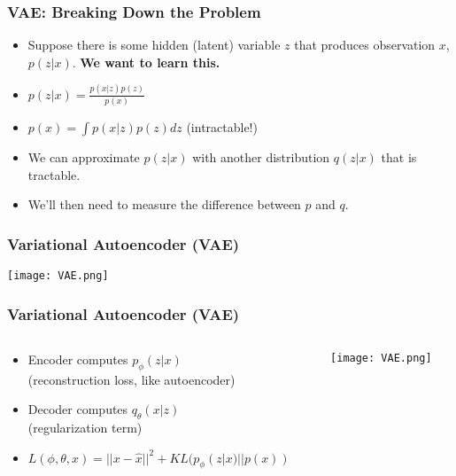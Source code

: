 \begin{frame}
    \frametitle{VAE: Breaking Down the Problem}
    \begin{itemize}
        \item<1-> Suppose there is some hidden (latent) variable $z$ that produces
            observation $x$, $p(z|x)$. \textbf{We want to learn this.}
        \item<2-> $p(z|x) = \frac{p(x|z)p(z)}{p(x)}$
        \item<3-> $p(x) = \int p(x|z)p(z)dz$ (intractable!)
        \item<4-> We can approximate $p(z|x)$ with another distribution $q(z|x)$
            that is tractable.
        \item<5-> We'll then need to measure the difference between $p$ and $q$.
    \end{itemize}
\end{frame}

\begin{frame}
    \frametitle{Variational Autoencoder (VAE)}
    \texttt{[image: VAE.png]}
\end{frame}

\begin{frame}
    \frametitle{Variational Autoencoder (VAE)}
    \begin{columns}
        \begin{column}{0.60\paperwidth}
            \begin{itemize}
                \item<1-> Encoder computes $p_\phi(z|x)$ \\(reconstruction loss, like
                    autoencoder)
                \item<2-> Decoder computes $q_\theta(x|z)$ \\(regularization term)
                \item<3-> $L(\phi,\theta,x) = ||x - \hat{x}||^2 + KL(p_\phi(z|x)
                    || p(x))$
            \end{itemize}
        \end{column}
        \begin{column}{0.40\paperwidth}
            \texttt{[image: VAE.png]}
        \end{column}
    \end{columns}
\end{frame}

